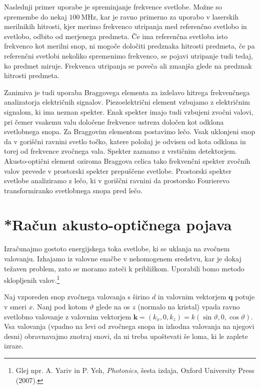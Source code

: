 Naslednji primer uporabe je spreminjanje frekvence svetlobe. Možne so spremembe
do nekaj $100~\si{\mega\hertz}$, kar je ravno primerno za uporabo v laserskih merilnikih
hitrosti, kjer merimo frekvenco utripanja med referenčno svetlobo in svetlobo, odbito od
merjenega predmeta. Če ima referenčna svetloba
isto frekvenco kot merilni snop, ni mogoče določiti predznaka hitrosti
predmeta, če pa referenčni svetlobi nekoliko spremenimo frekvenco,
se pojavi utripanje tudi tedaj, ko predmet miruje. Frekvenca utripanja
se poveča ali zmanjša glede na predznak hitrosti predmeta.

Zanimiva je tudi uporaba Braggovega elementa za izdelavo
hitrega frekvenčnega analizatorja električnih signalov.  
Piezoelektrični element vzbujamo z električnim signalom,
ki ima neznan spekter. Enak spekter imajo tudi vzbujeni zvočni valovi, 
pri čemer vsakemu valu določene frekvence ustreza določen kot odklona svetlobnega
snopa. Za Braggovim elementom postavimo lečo. Vsak uklonjeni
snop da v goriščni ravnini svetlo točko, katere položaj je odvisen
od kota odklona in torej od frekvence zvočnega vala. Spekter zaznamo
z vrstičnim detektorjem. Akusto-optični element oziroma Braggova celica 
tako frekvenčni spekter zvočnih valov prevede v prostorski
spekter prepuščene svetlobe. Prostorski spekter svetlobe
analiziramo z lečo, ki v goriščni ravnini da prostorsko
Fourierevo transformiranko svetlobnega snopa pred lečo.

\section{*Račun akusto-optičnega pojava}
Izračunajmo gostoto energijskega toka svetlobe, ki se uklanja na zvočnem valovanju. Izhajamo 
iz valovne enačbe v nehomogenem sredstvu, kar je dokaj težaven problem, zato 
se moramo zateči k približkom. Uporabili bomo metodo sklopljenih 
valov.\footnote{Glej npr. A. Yariv in 
P. Yeh, {\it Photonics}, šesta izdaja, Oxford University Press (2007).}

Naj vzporeden snop zvočnega valovanja s širino $d$ in valovnim vektorjem $\mathbf{q}$ 
potuje v smeri $x$.
Nanj pod kotom $\vartheta$ glede na os $z$ (normalo na kristal) 
vpada ravno svetlobno valovanje z valovnim vektorjem 
$\mathbf{k}=(k_{x},0,k_{z})= k(\sin\vartheta,0,\cos\vartheta)$.
Vsa valovanja (vpadno na levi od zvočnega snopa in izhodna valovanja na njegovi desni)
obravnavajmo znotraj snovi, da ni treba upoštevati še loma, ki
le zaplete izraze. 


